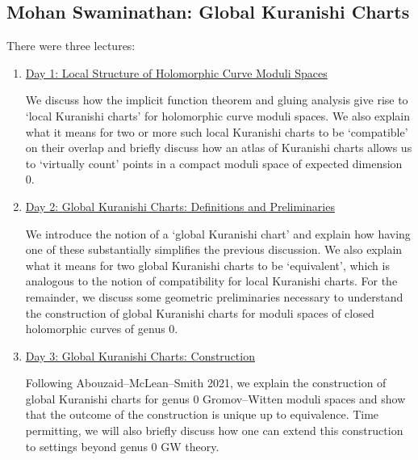 % 
%
%

\begin{partbacktext}
\part{Mohan Swaminathan: Global Kuranishi Charts}

There were three lectures:\\

\begin{enumerate}

    \item \href{#s1}{Day 1: Local Structure of Holomorphic Curve Moduli Spaces}

    We discuss how the implicit function theorem and gluing analysis give rise to ‘local Kuranishi charts’ for holomorphic curve moduli spaces. We also explain what it means for two or more such local Kuranishi charts to be ‘compatible’ on their overlap and briefly discuss how an atlas of Kuranishi charts allows us to ‘virtually count’ points in a compact moduli space of expected dimension 0.
    
    \item \href{#s2}{Day 2: Global Kuranishi Charts: Definitions and Preliminaries}

    We introduce the notion of a ‘global Kuranishi chart’ and explain how having one of these substantially simplifies the previous discussion. We also explain what it means for two global Kuranishi charts to be ‘equivalent’, which is analogous to the notion of compatibility for local Kuranishi charts. For the remainder, we discuss some geometric preliminaries necessary to understand the construction of global Kuranishi charts for moduli spaces of closed holomorphic curves of genus 0.

    \item \href{#s3}{Day 3: Global Kuranishi Charts: Construction}

    Following Abouzaid–McLean–Smith 2021, we explain the construction of global Kuranishi charts for genus 0 Gromov–Witten moduli spaces and show that the outcome of the construction is unique up to equivalence. Time permitting, we will also briefly discuss how one can extend this construction to settings beyond genus 0 GW theory.

\end{enumerate}

\end{partbacktext}